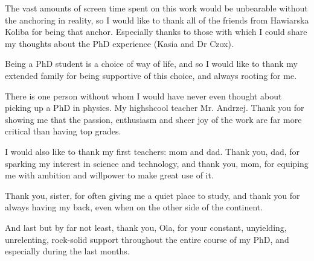 The vast amounts of screen time spent on this work would be unbearable without the anchoring in reality, so I would like to thank all of the friends from Hawiarska Koliba for being that anchor. Especially thanks to those with which I could share my thoughts about the PhD experience (Kasia and Dr Czox).

Being a PhD student is a choice of way of life, and so I would like to thank my extended family for being supportive of this choice, and always rooting for me.

There is one person without whom I would have never even thought about picking up a PhD in physics. My highshcool teacher Mr. Andrzej. Thank you for showing me that the passion, enthusiasm and sheer joy of the work are far more critical than having top grades.

I would also like to thank my first teachers: mom and dad. Thank you, dad, for sparking my interest in science and technology, and thank you, mom, for equiping me with ambition and willpower to make great use of it.

Thank you, sister, for often giving me a quiet place to study, and thank you for always having my back, even when on the other side of the continent.

And last but by far not least, thank you, Ola, for your constant, unyielding,
unrelenting, rock-solid support throughout the entire course of my PhD, and especially during the last months.

